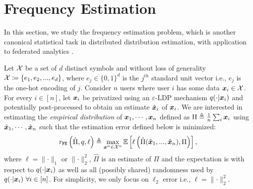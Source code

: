 \section{Frequency Estimation}
\label{sec:frequency_estimation}
In this section, we study the frequency estimation problem, which is another canonical statistical task in distributed distribution estimation, with application to federated analytics \citep{RM20}. 

Let $\mathcal{X}$ be a set of $d$ distinct symbols and without loss of generality $\mathcal{X} \coloneqq \left\{ e_1, e_2,...,e_d \right\}$, where $e_j \in \{0, 1\}^d$ is the $j^{th}$ standard unit vector i.e., $e_j$ is the one-hot encoding of $j$. Consider $n$ users where user $i$  
has some data ${\boldsymbol{x}}_i \in \mathcal{X}$. For every $i \in [n]$, let ${\boldsymbol{x}}_i$ be privatized using an $\varepsilon$-LDP mechanism $q(\cdot|{\boldsymbol{x}}_i)$ and potentially post-processed to obtain an estimate $\hat{{\boldsymbol{x}}}_i$ of ${\boldsymbol{x}}_i$.
We are interested in estimating the \emph{empirical distribution} of ${\boldsymbol{x}}_1, \cdots, {\boldsymbol{x}}_n$ defined as $\Pi \triangleq \frac{1}{n}\sum_i {\boldsymbol{x}}_i$ using $\hat{{\boldsymbol{x}}}_1,\cdots,\hat{{\boldsymbol{x}}}_n$ such that the estimation error defined below is minimized:
\begin{equation}\label{eq:rfe_def}
r_{\texttt{FE}} \left( \hat{\Pi}, q, \ell \right) \triangleq \max_{{\boldsymbol{x}}^n \in \mathcal{X}^n} \mathbb{E}\left[ \ell \left(  \hat{\Pi}(\hat{{\boldsymbol{x}}}_1,...,\hat{{\boldsymbol{x}}}_n), \Pi \right) \right],
\end{equation}
where $\ell =  \lVert \cdot \rVert_1$ or $\lVert \cdot \rVert^2_2$, $\hat{\Pi}$ is an estimate of $\Pi$ and
the expectation is with respect to $q(\cdot|{\boldsymbol{x}}_i) $ as well as all (possibly shared) randomness used by $q(\cdot|{\boldsymbol{x}}_i)~\forall i \in [n]$. For simplicity, we only focus on $\ell_2$ error i.e., $\ell = \lVert \cdot \rVert^2_2$.

